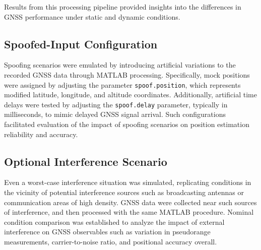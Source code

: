         Results from this processing pipeline provided insights into the differences in GNSS performance under static and dynamic conditions.
    
    \subsection{Spoofed-Input Configuration}

    Spoofing scenarios were emulated by introducing artificial variations to the recorded GNSS data through MATLAB processing. Specifically, mock positions were assigned by adjusting the parameter \texttt{spoof.position}, which represents modified latitude, longitude, and altitude coordinates. Additionally, artificial time delays were tested by adjusting the \texttt{spoof.delay} parameter, typically in milliseconds, to mimic delayed GNSS signal arrival. Such configurations facilitated evaluation of the impact of spoofing scenarios on position estimation reliability and accuracy.

    \subsection{Optional Interference Scenario}
    
    Even a worst-case interference situation was simulated, replicating conditions in the vicinity of potential interference sources such as broadcasting antennas or communication areas of high density. GNSS data were collected near such sources of interference, and then processed with the same MATLAB procedure. Nominal condition comparison was established to analyze the impact of external interference on GNSS observables such as variation in pseudorange measurements, carrier-to-noise ratio, and positional accuracy overall.